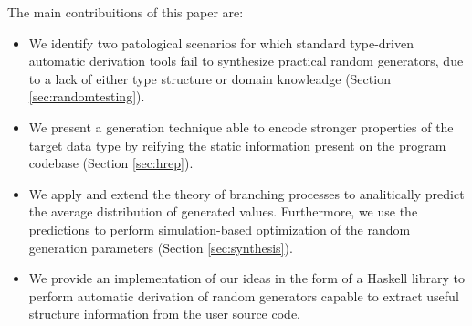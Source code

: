 The main contribuitions of this paper are:
%
\begin{itemize}
\item We identify two patological scenarios for which standard type-driven
  automatic derivation tools fail to synthesize practical random generators, due
  to a lack of either type structure or domain knowleadge (Section
  \ref{sec:randomtesting}).
\item We present a generation technique able to encode stronger properties of
  the target data type by reifying the static information present on the program
  codebase (Section \ref{sec:hrep}).
\item We apply and extend the theory of branching processes to analitically
  predict the average distribution of generated values.
  Furthermore, we use the predictions to perform simulation-based optimization
  of the random generation parameters (Section \ref{sec:synthesis}).
\item We provide an implementation of our ideas in the form of a Haskell library
  to perform automatic derivation of random generators capable to extract useful
  structure information from the user source code.
\end{itemize}

